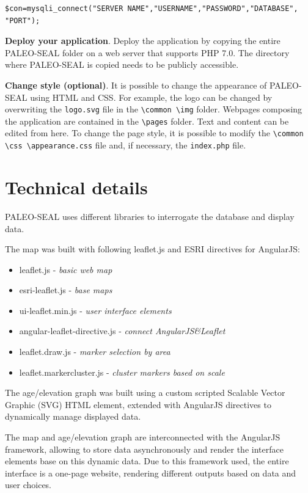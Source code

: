 \documentclass[a4paper,fleqn]{cas-dc}
\begin{document}
\begin{lstlisting}
$con=mysqli_connect("SERVER NAME","USERNAME","PASSWORD","DATABASE", "PORT");
\end{lstlisting}


\textbf{Deploy your application}. Deploy the application by copying the entire PALEO-SEAL folder on a web server that supports PHP 7.0. The directory where PALEO-SEAL is copied needs to be publicly accessible.

\textbf{Change style (optional)}. It is possible to change the appearance of PALEO-SEAL using HTML and CSS. For example, the logo can be changed by overwriting the \texttt{logo.svg} file in the \texttt{\textbackslash common \textbackslash img} folder. Webpages composing the application are contained in the \texttt{\textbackslash pages} folder. Text and content can be edited from here. To change the page style, it is possible to modify the \texttt{\textbackslash common \textbackslash css \textbackslash appearance.css} file and, if necessary, the \texttt{index.php} file.

\section{Technical details}
PALEO-SEAL uses different libraries to interrogate the database and display data. 

The map was built with following leaflet.js and ESRI directives for AngularJS:
\begin{itemize}
	\item leaflet.js - \textit{basic web map}
	\item esri-leaflet.js - \textit{base maps}
	\item ui-leaflet.min.js - \textit{user interface elements}
	\item angular-leaflet-directive.js - \textit{connect AngularJS\&Leaflet}
	\item leaflet.draw.js - \textit{marker selection by area }
	\item leaflet.markercluster.js - \textit{cluster markers based on scale }
\end{itemize}

The age/elevation graph was built using a custom scripted Scalable Vector Graphic (SVG) HTML element, extended with AngularJS directives to dynamically manage displayed data. \

The map and age/elevation graph are interconnected with the AngularJS framework, allowing to store data asynchronously and render the interface elements base on this dynamic data. Due to this framework used, the entire interface is a one-page website, rendering different outputs based on data and user choices. 
\end{document}
